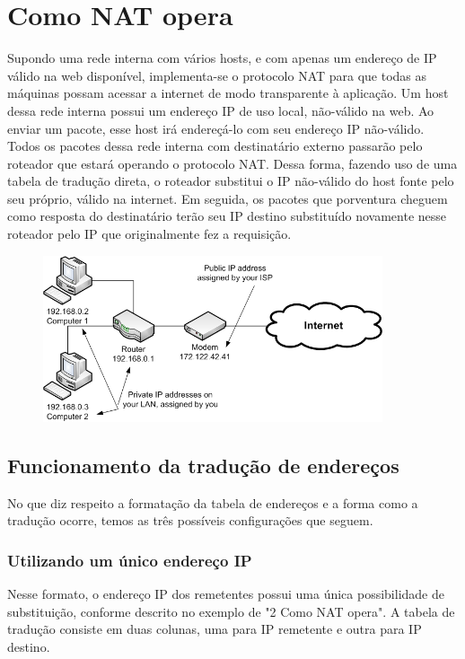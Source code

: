 \documentclass[
	12pt,				%
	oneside,			%
	a4paper,			%
	english,			%
	brazil,				%
	]{ime-abntex2}
\begin{document}
\section{Como NAT opera}

Supondo uma rede interna com vários hosts, e com apenas um endereço de IP válido na web disponível,
implementa-se o protocolo NAT para que todas as máquinas possam acessar a internet de modo transparente
à aplicação. Um host dessa rede interna possui um endereço IP de uso local, não-válido na web.
Ao enviar um pacote, esse host irá endereçá-lo com seu endereço IP não-válido. Todos os pacotes
dessa rede interna com destinatário externo passarão pelo roteador que estará operando o protocolo NAT.
Dessa forma, fazendo uso de uma tabela de tradução direta, o roteador substitui o IP não-válido do host
fonte pelo seu próprio, válido na internet. Em seguida, os pacotes que porventura
cheguem como resposta do destinatário terão seu IP destino substituído novamente nesse roteador pelo IP que originalmente fez a requisição.

\begin{figure}[ht]
\centering
\includegraphics[width=10cm]{imgs/Single_NAT}
\end{figure}

\subsection{Funcionamento da tradução de endereços}

No que diz respeito a formatação da tabela de endereços e a forma como a tradução ocorre, temos as três
possíveis configurações que seguem.

\subsubsection{Utilizando um único endereço IP}

Nesse formato, o endereço IP dos remetentes possui uma única possibilidade de substituição, conforme
descrito no exemplo de "2 Como NAT opera". A tabela de tradução consiste em duas colunas, uma para IP remetente e outra para IP
destino.
\end{document}
